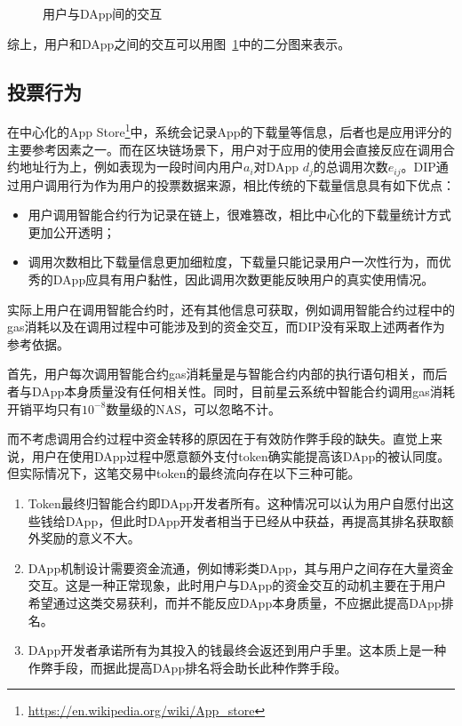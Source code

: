 \begin{figure}
	\centering
  
\caption{用户与DApp间的交互 \label{fig:interact}}
\end{figure}

综上，用户和DApp之间的交互可以用图~\ref{fig:interact}中的二分图来表示。

\subsection{投票行为}
\label{subsection:voting}
在中心化的App Store\footnote{\url{https://en.wikipedia.org/wiki/App\_store}}中，系统会记录App的下载量等信息，后者也是应用评分的主要参考因素之一。而在区块链场景下，用户对于应用的使用会直接反应在调用合约地址行为上，例如表现为一段时间内用户$a_i$对DApp $d_j$的总调用次数$e_{ij}$。DIP通过用户调用行为作为用户的投票数据来源，相比传统的下载量信息具有如下优点：

\begin{itemize}
	\item 用户调用智能合约行为记录在链上，很难篡改，相比中心化的下载量统计方式更加公开透明；
	\item 调用次数相比下载量信息更加细粒度，下载量只能记录用户一次性行为，而优秀的DApp应具有用户黏性，因此调用次数更能反映用户的真实使用情况。
\end{itemize}

实际上用户在调用智能合约时，还有其他信息可获取，例如调用智能合约过程中的gas消耗以及在调用过程中可能涉及到的资金交互，而DIP没有采取上述两者作为参考依据。

首先，用户每次调用智能合约gas消耗量是与智能合约内部的执行语句相关，而后者与DApp本身质量没有任何相关性。同时，目前星云系统中智能合约调用gas消耗开销平均只有$10^{-8}$数量级的NAS，可以忽略不计。


而不考虑调用合约过程中资金转移的原因在于有效防作弊手段的缺失。直觉上来说，用户在使用DApp过程中愿意额外支付token确实能提高该DApp的被认同度。但实际情况下，这笔交易中token的最终流向存在以下三种可能。
\begin{enumerate}
\item Token最终归智能合约即DApp开发者所有。这种情况可以认为用户自愿付出这些钱给DApp，但此时DApp开发者相当于已经从中获益，再提高其排名获取额外奖励的意义不大。

\item DApp机制设计需要资金流通，例如博彩类DApp，其与用户之间存在大量资金交互。这是一种正常现象，此时用户与DApp的资金交互的动机主要在于用户希望通过这类交易获利，而并不能反应DApp本身质量，不应据此提高DApp排名。

\item DApp开发者承诺所有为其投入的钱最终会返还到用户手里。这本质上是一种作弊手段，而据此提高DApp排名将会助长此种作弊手段。
\end{enumerate}


